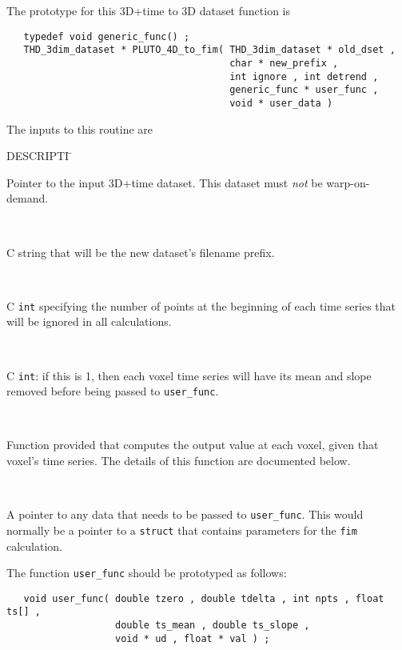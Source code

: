 \vset
The prototype for this 3D+time to 3D dataset function is
\begin{samepage}\begin{verbatim}
   typedef void generic_func() ;
   THD_3dim_dataset * PLUTO_4D_to_fim( THD_3dim_dataset * old_dset ,
                                       char * new_prefix ,
                                       int ignore , int detrend ,
                                       generic_func * user_func ,
                                       void * user_data )
\end{verbatim}\end{samepage}
\vset\noindent
The inputs to this routine are
\renewcommand{\tb}[1]{\parbox[t]{5.2in}{\sloppy #1}}
\begin{tabbing}
 \blob DESCRIPTI \= \kill
%
  \> \tb{Pointer to the input 3D+time dataset.
                            This dataset must {\it not\/} be warp-on-demand.} \\[.9ex]
%
  \> \tb{C string that will be the new dataset's filename prefix.}\\[.9ex]
%
  \> \tb{C {\tt int} specifying the number of points at the beginning
                         of each time series that will be ignored in all calculations.}\\[.9ex]
%
  \> \tb{C {\tt int}: if this is 1, then each voxel time series will have
                          its mean and slope removed before being passed to {\tt user\_func}.}
                       \\[.9ex]
%
  \> \tb{Function provided that computes the output value at each
                             voxel, given that voxel's time series.
                             The details of this function are documented below.}\\[.9ex]

  \> \tb{A pointer to any data that needs to be passed to
                              {\tt user\_func}.  This would normally be a pointer
                              to a {\tt struct} that contains parameters for
                              the {\tt fim} calculation.}
%
\end{tabbing}
The function {\tt user\_func} should be prototyped as follows:
\begin{samepage}\begin{verbatim}
   void user_func( double tzero , double tdelta , int npts , float ts[] ,
                   double ts_mean , double ts_slope ,
                   void * ud , float * val ) ;
\end{verbatim}\end{samepage}

